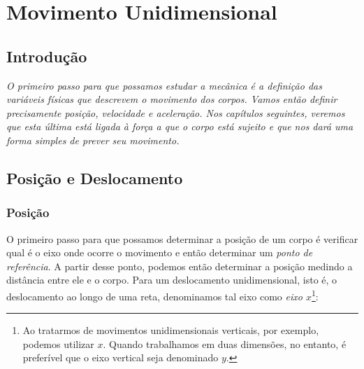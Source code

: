 \chapter{Movimento Unidimensional}
\label{Chap:MovimentoUnidimensional}



\section{Introdução}

{\it
O primeiro passo para que possamos estudar a mecânica é a definição das variáveis físicas que descrevem o movimento dos corpos. Vamos então definir precisamente posição, velocidade e aceleração. Nos capítulos seguintes, veremos que esta última está ligada à força a que o corpo está sujeito e que nos dará uma forma simples de prever seu movimento.
}

\section{Posição e Deslocamento}

\subsection{Posição}

O primeiro passo para que possamos determinar a posição de um corpo  é verificar qual é o eixo onde ocorre o movimento e então determinar um \emph{ponto de referência}. A partir desse ponto, podemos então determinar a posição medindo a distância entre ele e o corpo. Para um deslocamento unidimensional, isto é, o deslocamento ao longo de uma reta, denominamos tal eixo como \emph{eixo $x$}\footnote{Ao tratarmos de movimentos unidimensionais verticais, por exemplo, podemos utilizar $x$. Quando trabalhamos em duas dimensões, no entanto, é preferível que o eixo vertical seja denominado $y$.}:

